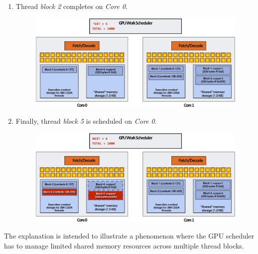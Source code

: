 \begin{enumerate}
    \item Thread \emph{block 2} completes on \emph{Core 0}.
    \begin{figure}[!htp]
        \centering
        \includegraphics[width=\textwidth]{img/cuda-convolve-kernel-8.pdf}
    \end{figure}

    \item Finally, thread \emph{block 5} is scheduled on \emph{Core 0}.
    \begin{figure}[!htp]
        \centering
        \includegraphics[width=\textwidth]{img/cuda-convolve-kernel-9.pdf}
    \end{figure}
\end{enumerate}
The explanation is intended to illustrate a phenomenon where the GPU scheduler has to manage limited shared memory resources across multiple thread blocks.
